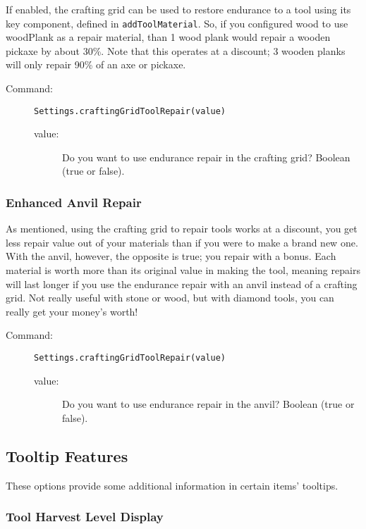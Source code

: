 \documentclass[letterpaper,titlepage,12pt]{article}
\begin{document}
If enabled, the crafting grid can be used to restore endurance to a tool using its key component, defined in \texttt{addToolMaterial}.  So, if you configured wood to use woodPlank as a repair material, than 1 wood plank would repair a wooden pickaxe by about 30\%.  Note that this operates at a discount; 3 wooden planks will only repair 90\% of an axe or pickaxe.

\begin{description}
\item[Command:] \texttt{Settings.craftingGridToolRepair(value)}
\begin{description}
\item [value:] Do you want to use endurance repair in the crafting grid?  Boolean (true or false).
\end{description}
\end{description}

\subsubsection{Enhanced Anvil Repair}

As mentioned, using the crafting grid to repair tools works at a discount, you get less repair value out of your materials than if you were to make a brand new one.  With the anvil, however, the opposite is true; you repair with a bonus.  Each material is worth more than its original value in making the tool, meaning repairs will last longer if you use the endurance repair with an anvil instead of a crafting grid.  Not really useful with stone or wood, but with diamond tools, you can really get your money's worth!

\begin{description}
\item[Command:] \texttt{Settings.craftingGridToolRepair(value)}
\begin{description}
\item [value:] Do you want to use endurance repair in the anvil?  Boolean (true or false).
\end{description}
\end{description}

\subsection{Tooltip Features}

These options provide some additional information in certain items' tooltips.

\subsubsection{Tool Harvest Level Display}
\end{document}
